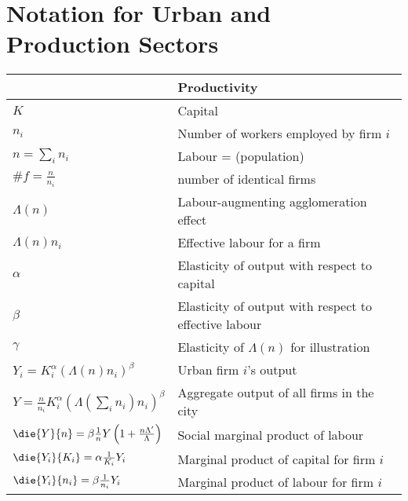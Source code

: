 \documentclass{standalone}
\begin{document}
 
\section{Notation for Urban and Production Sectors}


\begin{longtable}{lp{10cm}}
\hline
		&\textbf{Productivity}\\ \hline
$K$  &  Capital\\
$n_i$  &  Number of workers employed by firm $i$\\
$n=\sum_i n_i$  &  Labour = (population)\\
$\#f=\frac{n}{n_i}$&number of identical firms\\ %
$\Lambda(n)$  &  Labour-augmenting agglomeration effect \\
$\Lambda(n)n_i$  &  Effective labour for a firm\\
$\alpha$  &  Elasticity of output with respect to capital\\
$\beta$  &  Elasticity of output with respect to effective labour\\
$\gamma$  &  Elasticity of $\Lambda(n)$ for illustration\\

$Y_i=K_i^{\alpha }(\Lambda(n)n_i)^{\beta }$  &  Urban firm $i$'s output\\
$Y=\frac{n}{n_i}K_i^{\alpha }(\Lambda(\sum_i n_i)n_i)^{\beta }$  &  Aggregate output of all firms in the city\\
$\die{Y}{n}=\beta\frac{1}{n} Y  \left( 1+ \frac{n\Lambda'}{\Lambda} \right) $  &  Social marginal product of labour\\
$\die{Y_i}{K_i}	=\alpha \frac{1}{K_i} Y_i $  & Marginal product of capital for firm $i$
\\
$\die{Y_i}{n_i}	=  \beta\frac{1}{n_i} Y_i $  &  Marginal product of labour for firm $i$\\


\end{longtable}
\end{document}
